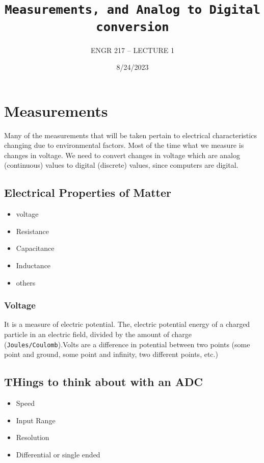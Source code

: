 \documentclass[a4paper,12pt]{article}
\title{\texttt{Measurements, and Analog to Digital conversion}\\\hrulefill}
\author{ENGR 217 – LECTURE 1}
\date{\small{8/24/2023}}
\begin{document}
    \maketitle

    \section{Measurements}
        \par Many of the measurements that will be taken pertain to electrical characteristics changing due to environmental factors. Most of the time what we measure is changes in voltage. We need to convert changes in voltage which are analog (continuous) values to digital (discrete) values, since computers are digital.
        
        \subsection*{Electrical Properties of Matter}
          \begin{itemize}
            \item voltage
            \item Resistance
            \item Capacitance
            \item Inductance
            \item others
          \end{itemize}
            \subsubsection*{Voltage}
              It is a measure of electric potential. The, electric potential energy of a charged particle in an electric field, divided by the amount of charge (\texttt{Joules/Coulomb}).Volts are a difference in potential between two points (some point and ground, some point and infinity, two different points, etc.)

        \subsection*{THings to think about with an ADC}
          \begin{itemize}
            \item Speed
            \item Input Range
            \item Resolution
            \item Differential or single ended
          \end{itemize}
\end{document}

